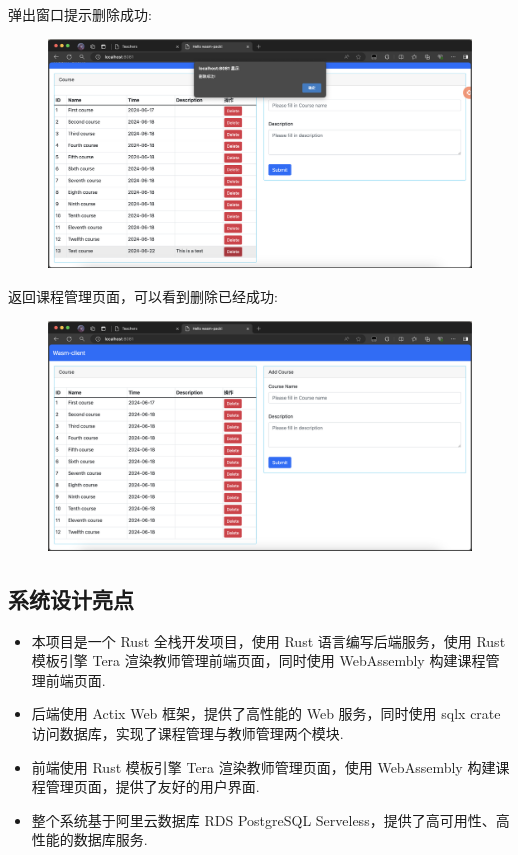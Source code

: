 \documentclass[12pt, oneside]{ctexart}
\numberwithin{figure}{section}
\numberwithin{table}{section}
\begin{document}
弹出窗口提示删除成功:
\begin{figure}[!htbp]
    \centering
    \includegraphics[width=13cm]{images/sec5/Delete_Course_Success.png}
\end{figure}
\newpage
返回课程管理页面，可以看到删除已经成功:
\begin{figure}[!htbp]
    \centering
    \includegraphics[width=13cm]{images/sec5/Delete_Course_Check.png}
\end{figure}

\subsection{系统设计亮点}

\begin{itemize}
    \item 本项目是一个 Rust 全栈开发项目，使用 Rust 语言编写后端服务，使用 Rust 模板引擎 Tera 渲染教师管理前端页面，同时使用 Web­Assembly 构建课程管理前端页面.
    \item 后端使用 Actix Web 框架，提供了高性能的 Web 服务，同时使用 sqlx crate 访问数据库，实现了课程管理与教师管理两个模块.
    \item 前端使用 Rust 模板引擎 Tera 渲染教师管理页面，使用 Web­Assembly 构建课程管理页面，提供了友好的用户界面.
    \item 整个系统基于阿里云数据库 RDS PostgreSQL Serveless，提供了高可用性、高性能的数据库服务.
\end{itemize}
\end{document}
